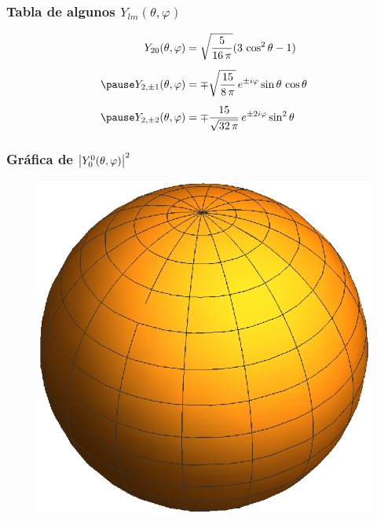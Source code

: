 \documentclass[12pt]{beamer}
\begin{document}
\begin{frame}
\frametitle{Tabla de algunos $Y_{lm}(\theta, \varphi)$}
\begin{eqnarray*}
\begin{aligned}
Y_{20} (\theta, \varphi) &= \sqrt{\dfrac{5}{16 \, \pi}} (3 \, \cos^{2} \theta - 1) \\[0.5em] \pause
Y_{2, \pm 1} (\theta, \varphi) &= \mp \sqrt{\dfrac{15}{8 \, \pi}} \, e^{\pm i \varphi} \sin \theta \, \cos \theta \\[0.5em] \pause
Y_{2, \pm 2} (\theta, \varphi) &= \mp \dfrac{15}{\sqrt{32 \, \pi}} \, e^{\pm 2 i \varphi} \sin^{2} \theta
\end{aligned}
\end{eqnarray*}
\end{frame}
\begin{frame}
\frametitle{Gráfica de $\abs{Y_{0}^{0} (\theta, \varphi)}^{2}$}
\begin{figure}
    \centering
    \includegraphics[scale=0.8]{Imagenes/AE2_00.eps}
\end{figure}
\end{frame}
\end{document}
